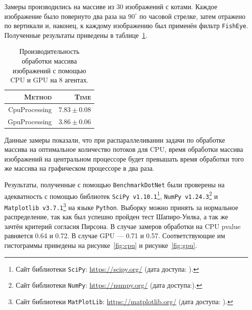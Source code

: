 Замеры производились на массиве из 30 изображений с котами. Каждое изображение было повернуто два раза на $90^{\circ}$ по часовой стрелке, затем отражено по вертикали и, наконец, к каждому изображению был применён фильтр \texttt{FishEye}. Полученные результаты приведены в таблице~\ref{processing}.

\begin{table}[h]
\centering
    \caption{Производительность обработки массива изображений с помощью CPU и GPU на 8 агентах.}
    \begin{tabular}{| r | r |}
    \hline
        \textsc{Method} & \textsc{Time} \\ 
        \hline
        CpuProcessing & $7.83 \pm 0.08$ \\ 
        GpuProcessing & $3.86 \pm 0.06$ \\
    \hline    
    \end{tabular}%
    \label{processing}
\end{table}

Данные замеры показали, что при распараллеливании задачи по обработке массива на оптимальное количество потоков для CPU, время обработки массива изображений на центральном процессоре будет превышать время обработки того же массива на графическом процессоре в два раза.

Результаты, полученные с помощью \texttt{BenchmarkDotNet} были проверены на адекватность с помощью библиотек \texttt{SciPy v1.10.1}\footnote{Сайт библиотеки \texttt{SciPy}: \url{https://scipy.org/} (дата доступа:   ).}, \texttt{NumPy v1.24.3}\footnote{Сайт библиотеки \texttt{NumPy}: \url{https://numpy.org/} (дата доступа:).} и \texttt{Matplotlib v3.7.1}\footnote{Сайт библиотеки \texttt{MatPlotLib}: \url{https://matplotlib.org/} (дата доступа:   ).} на языке \texttt{Python}. Выборку можно принять за нормальное распределение, так как был успешно пройден тест Шапиро-Уилка, а так же зачтён критерий согласия Пирсона. В случае замеров обработки на CPU pvalue равняется 0.64 и 0.72. В случае GPU --- 0.71 и 0.57. Соответствующие им гистограммы приведены на рисунке~\ref{fig:cpu} и рисунке~\ref{fig:gpu}.

